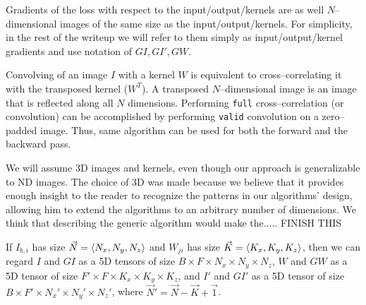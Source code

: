   Gradients of the loss with respect to the input/output/kernels are
  as well $N$--dimensional images of the same size as the
  input/output/kernels.  For simplicity, in the rest of the writeup we
  will refer to them simply as input/output/kernel gradients and use
  notation of $GI, GI', GW$.

  Convolving of an image $I$ with a kernel $W$ is equivalent to
  cross--correlating it with the transposed kernel ($W^T$).  A
  transposed $N$--dimensional image is an image that is reflected
  along all $N$ dimensions.  Performing \texttt{full}
  cross--correlation (or convolution) can be accomplished by
  performing \texttt{valid} convolution on a zero--padded image.
  Thus, same algorithm can be used for both the forward and the
  backward pass.

  We will assume 3D images and kernels, even though our approach is
  generalizable to ND images.  The choice of 3D was made because we
  believe that it provides enough insight to the reader to recognize
  the patterns in our algorithms' design, allowing him to extend the
  algorithms to an arbitrary number of dimensions.  We think that
  describing the generic algorithm would make the..... FINISH THIS


  If $I_{b,i}$ has size $\vec{N} = \langle N_x, N_y, N_z\rangle$ and
  $W_{ji}$ has size $\vec{K} = \langle K_x,K_y,K_z\rangle$, then we can
  regard $I$ and $GI$ as a 5D tensors of size $B \times F \times N_x
  \times N_y \times N_z$, $W$ and $GW$ as a 5D tensor of size $F'
  \times F \times K_x \times K_y \times K_z$, and $I'$ and $GI'$ as a
  5D tensor of size $B \times F' \times N_x' \times N_y' \times N_z'$,
  where $\vec{N}' = \vec{N} - \vec{K} + \vec{1}$.

